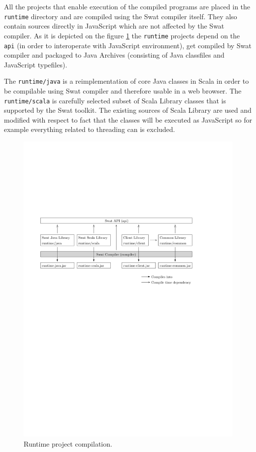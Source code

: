 \documentclass[12pt,a4paper]{report}
\begin{document}
All the projects that enable execution of the compiled programs are placed in the \texttt{runtime} directory and are compiled using the Swat compiler itself. They also contain sources directly in JavaScript which are not affected by the Swat compiler. As it is depicted on the figure \ref{RuntimeCompilation} the \texttt{runtime} projects depend on the \texttt{api} (in order to interoperate with JavaScript environment), get compiled by Swat compiler and packaged to Java Archives (consisting of Java classfiles and JavaScript typefiles).

The \texttt{runtime/java} is a reimplementation of core Java classes in Scala in order to be compilable using Swat compiler and therefore usable in a web browser. The \texttt{runtime/scala} is carefully selected subset of Scala Library classes that is supported by the Swat toolkit. The existing sources of Scala Library are used and modified with respect to fact that the classes will be executed as JavaScript so for example everything related to threading can is excluded.

\begin{figure}[ht]
  \centering
	\includegraphics[width=\linewidth,height=\textheight,keepaspectratio]{img/RuntimeCompilation.pdf}
	\caption{Runtime project compilation.}
	\label{RuntimeCompilation}
\end{figure}
\end{document}
